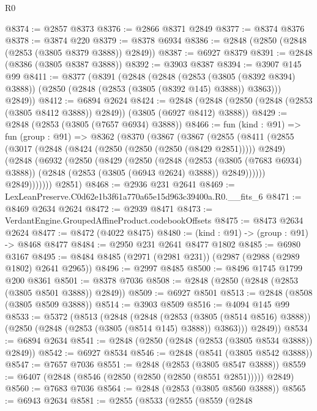 \begin{lexlean}{R0}
\begin{coremodule}
@8374 := @2857 @8373
@8376 := @2866 @8371 @2849
@8377 := @8374 @8376
@8378 := @3874 @220
@8379 := @8378 @6934
@8386 := @2848 (@2850 (@2848 (@2853 (@3805 @8379 @3888)) @2849))
@8387 := @6927 @8379
@8391 := @2848 (@8386 (@3805 @8387 @3888))
@8392 := @3903 @8387
@8394 := @3907 @145 @99
@8411 := @8377
    (@8391
      (@2848
        (@2848
          (@2853 (@3805 (@8392 @8394) @3888))
          (@2850 (@2848 (@2853 (@3805 (@8392 @145) @3888)) @3863)))
        @2849))
@8412 := @6894 @2624
@8424 := @2848 (@2848 (@2850 (@2848 (@2853 (@3805 @8412 @3888)) @2849)) (@3805 (@6927 @8412) @3888))
@8429 := @2848 (@2853 (@3805 (@7657 @6934) @3888))
@8466 := fun (kind : @91) =>
  fun (group : @91) =>
  @8362
    (@8370
      (@3867
        (@3867
          (@2855
            (@8411
              (@2855
                (@3017
                  (@2848 (@8424 (@2850 (@2850 (@2850 (@8429 @2851))))) @2849)
                  (@2848
                    (@6932
                      (@2850
                        (@8429
                          (@2850
                            (@2848
                              (@2853 (@3805 (@7683 @6934) @3888))
                              (@2848 (@2853 (@3805 (@6943 @2624) @3888)) @2849))))))
                    @2849)))))))
      @2851)
@8468 := @2936 @231 @2641
@8469 := LexLeanPreserve.C0d62e1b3f61a770a65e15d963c39400a.R0.__fits_6
@8471 := @8469 @2634 @2624
@8472 := @2939 @8471
@8473 := VerdantEngine.GroupedAffineProduct.codebookOffsets
@8475 := @8473 @2634 @2624
@8477 := @8472 (@4022 @8475)
@8480 := (kind : @91) -> (group : @91) -> @8468 @8477
@8484 := @2950 @231 @2641 @8477 @1802
@8485 := @6980 @3167
@8495 := @8484 @8485 (@2971 (@2981 @231)) (@2987 (@2988 (@2989 @1802) @2641 @2965))
@8496 := @2997 @8485
@8500 := @8496 @1745 @1799 @200 @8361
@8501 := @8378 @7036
@8508 := @2848 (@2850 (@2848 (@2853 (@3805 @8501 @3888)) @2849))
@8509 := @6927 @8501
@8513 := @2848 (@8508 (@3805 @8509 @3888))
@8514 := @3903 @8509
@8516 := @4094 @145 @99
@8533 := @5372
    (@8513
      (@2848
        (@2848
          (@2853 (@3805 (@8514 @8516) @3888))
          (@2850 (@2848 (@2853 (@3805 (@8514 @145) @3888)) @3863)))
        @2849))
@8534 := @6894 @2634
@8541 := @2848 (@2850 (@2848 (@2853 (@3805 @8534 @3888)) @2849))
@8542 := @6927 @8534
@8546 := @2848 (@8541 (@3805 @8542 @3888))
@8547 := @7657 @7036
@8551 := @2848 (@2853 (@3805 @8547 @3888))
@8559 := @6407 (@2848 (@8546 (@2850 (@2850 (@2850 (@8551 @2851))))) @2849)
@8560 := @7683 @7036
@8564 := @2848 (@2853 (@3805 @8560 @3888))
@8565 := @6943 @2634
@8581 := @2855
    (@8533
      (@2855
        (@8559
          (@2848

\end{coremodule}
\end{lexlean}
